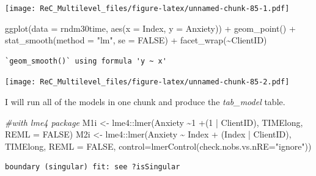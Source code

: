 \documentclass[
  english,
]{book}
\newenvironment{Shaded}{\begin{snugshade}}{\end{snugshade}}
\newcommand{\AttributeTok}[1]{\textcolor[rgb]{0.77,0.63,0.00}{#1}}
\newcommand{\CommentTok}[1]{\textcolor[rgb]{0.56,0.35,0.01}{\textit{#1}}}
\newcommand{\ConstantTok}[1]{\textcolor[rgb]{0.00,0.00,0.00}{#1}}
\newcommand{\DecValTok}[1]{\textcolor[rgb]{0.00,0.00,0.81}{#1}}
\newcommand{\FunctionTok}[1]{\textcolor[rgb]{0.00,0.00,0.00}{#1}}
\newcommand{\NormalTok}[1]{#1}
\newcommand{\OtherTok}[1]{\textcolor[rgb]{0.56,0.35,0.01}{#1}}
\newcommand{\SpecialCharTok}[1]{\textcolor[rgb]{0.00,0.00,0.00}{#1}}
\newcommand{\StringTok}[1]{\textcolor[rgb]{0.31,0.60,0.02}{#1}}
\begin{document}
\texttt{[image: ReC\_Multilevel\_files/figure-latex/unnamed-chunk-85-1.pdf]}

\begin{Shaded}
\begin{Highlighting}[]
\FunctionTok{ggplot}\NormalTok{(}\AttributeTok{data =}\NormalTok{ rndm30time, }\FunctionTok{aes}\NormalTok{(}\AttributeTok{x =}\NormalTok{ Index, }\AttributeTok{y =}\NormalTok{ Anxiety)) }\SpecialCharTok{+} \FunctionTok{geom\_point}\NormalTok{() }\SpecialCharTok{+}
    \FunctionTok{stat\_smooth}\NormalTok{(}\AttributeTok{method =} \StringTok{"lm"}\NormalTok{, }\AttributeTok{se =} \ConstantTok{FALSE}\NormalTok{) }\SpecialCharTok{+} \FunctionTok{facet\_wrap}\NormalTok{(}\SpecialCharTok{\textasciitilde{}}\NormalTok{ClientID)}
\end{Highlighting}
\end{Shaded}

\begin{verbatim}
`geom_smooth()` using formula 'y ~ x'
\end{verbatim}

\texttt{[image: ReC\_Multilevel\_files/figure-latex/unnamed-chunk-85-2.pdf]}

I will run all of the models in one chunk and produce the \emph{tab\_model} table.

\begin{Shaded}
\begin{Highlighting}[]
\CommentTok{\#with lme4 package}
\NormalTok{M1i }\OtherTok{\textless{}{-}}\NormalTok{ lme4}\SpecialCharTok{::}\FunctionTok{lmer}\NormalTok{(Anxiety }\SpecialCharTok{\textasciitilde{}}\DecValTok{1} \SpecialCharTok{+}\NormalTok{(}\DecValTok{1} \SpecialCharTok{|}\NormalTok{ ClientID), TIMElong, }\AttributeTok{REML =} \ConstantTok{FALSE}\NormalTok{)}
\NormalTok{M2i }\OtherTok{\textless{}{-}}\NormalTok{ lme4}\SpecialCharTok{::}\FunctionTok{lmer}\NormalTok{(Anxiety }\SpecialCharTok{\textasciitilde{}}\NormalTok{ Index }\SpecialCharTok{+}\NormalTok{ (Index }\SpecialCharTok{|}\NormalTok{ ClientID), TIMElong, }\AttributeTok{REML =} \ConstantTok{FALSE}\NormalTok{, }\AttributeTok{control=}\FunctionTok{lmerControl}\NormalTok{(}\AttributeTok{check.nobs.vs.nRE=}\StringTok{"ignore"}\NormalTok{))}
\end{Highlighting}
\end{Shaded}

\begin{verbatim}
boundary (singular) fit: see ?isSingular
\end{verbatim}
\end{document}
